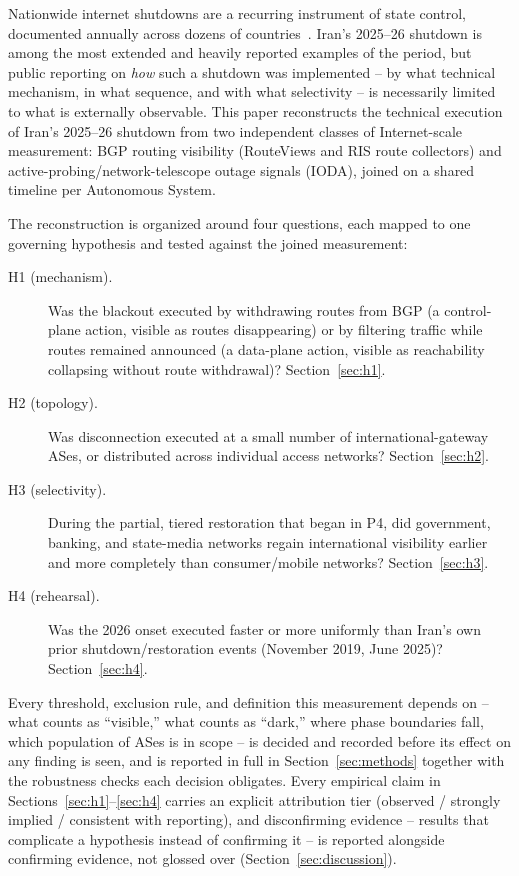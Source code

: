 Nationwide internet shutdowns are a recurring instrument of state control,
documented annually across dozens of countries~\citep{accessnow2026keepiton}.
Iran's 2025--26 shutdown is among the most extended and heavily reported
examples of the period, but public reporting on \emph{how} such a shutdown
was implemented -- by what technical mechanism, in what sequence, and with
what selectivity -- is necessarily limited to what is externally
observable. This paper reconstructs the technical execution of Iran's
2025--26 shutdown from two independent classes of Internet-scale
measurement: BGP routing visibility (RouteViews and RIS route collectors)
and active-probing/network-telescope outage signals (IODA), joined on a
shared timeline per Autonomous System.

The reconstruction is organized around four questions, each mapped to one
governing hypothesis and tested against the joined measurement:

\begin{description}
\item[H1 (mechanism).] Was the blackout executed by withdrawing routes from
  BGP (a control-plane action, visible as routes disappearing) or by
  filtering traffic while routes remained announced (a data-plane action,
  visible as reachability collapsing without route withdrawal)?
  Section~\ref{sec:h1}.
\item[H2 (topology).] Was disconnection executed at a small number of
  international-gateway ASes, or distributed across individual access
  networks? Section~\ref{sec:h2}.
\item[H3 (selectivity).] During the partial, tiered restoration that began
  in P4, did government, banking, and state-media networks regain
  international visibility earlier and more completely than consumer/mobile
  networks? Section~\ref{sec:h3}.
\item[H4 (rehearsal).] Was the 2026 onset executed faster or more uniformly
  than Iran's own prior shutdown/restoration events (November 2019, June
  2025)? Section~\ref{sec:h4}.
\end{description}

Every threshold, exclusion rule, and definition this measurement depends on
-- what counts as ``visible,'' what counts as ``dark,'' where phase
boundaries fall, which population of ASes is in scope -- is decided and
recorded before its effect on any finding is seen, and is reported in full
in Section~\ref{sec:methods} together with the robustness checks each
decision obligates. Every empirical claim in Sections~\ref{sec:h1}--\ref{sec:h4}
carries an explicit attribution tier (observed / strongly implied /
consistent with reporting), and disconfirming evidence -- results that
complicate a hypothesis instead of confirming it -- is reported alongside
confirming evidence, not glossed over
(Section~\ref{sec:discussion}).

